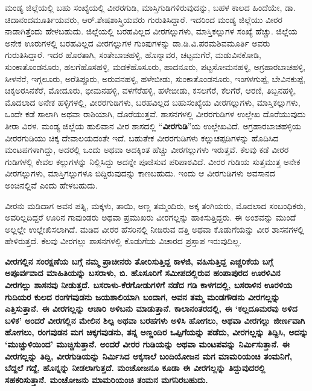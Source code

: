 ಮಂಡ್ಯ ಜಿಲ್ಲೆಯಲ್ಲಿ ಬಹು ಸಂಖ್ಯೆಯಲ್ಲಿ ವೀರರಗುಡಿ, ಮಾಸ್ತಿಗುಡಿಗಳಿರುವುದನ್ನು, ಬಹಳ ಕಾಲದ ಹಿಂದೆಯೇ, ಡಾ. ಚಿದಾನಂದಮೂರ್ತಿಯವರು, ಆರ್​.ಶೇಷಶಾಸ್ತ್ರಿಯವರು ಗುರುತಿಸಿದ್ದಾರೆ. ಇದರಿಂದ ಮಂಡ್ಯ ಜಿಲ್ಲೆಯು ವೀರರ ನಾಡಾಗಿತ್ತೆಂದು ಹೇಳಬಹುದು. ಜಿಲ್ಲೆಯಲ್ಲಿ ಬರಹವಿಲ್ಲದ ವೀರಗಲ್ಲುಗಳು, ಮಾಸ್ತಿಕಲ್ಲುಗಳ ಸಂಖ್ಯೆ ಹೆಚ್ಚು. ಜಿಲ್ಲೆಯ ಅನೇಕ ಊರುಗಳಲ್ಲಿ ಬರಹವಿಲ್ಲದ ವೀರಗಲ್ಲುಗಳ ಗುಂಪುಗಳನ್ನು ಡಾ.ಡಿ.ವಿ.ಪರಮಶಿವಮೂರ್ತಿ ಅವರು ಗುರುತಿಸಿದ್ದಾರೆ. ಇದರ ಹೊರತಾಗಿ, ಸಂತೇಬಾಚಹಳ್ಳಿ, ಹೊನ್ನಾವರ, ಚಟ್ಟಮಗೆರೆ, ಮಡುವಿನಕೋಡಿ, ಸುಂಕಾತೊಂಡನೂರು, ಹಲಗೆಹೊಸಹಳ್ಳಿ, ಮಡಕೆಹೊಸೂರು, ಹಾದನೂರು, ಪಟ್ಟಸೋಮನಹಳ್ಳಿ, ಅಗ್ರಹಾರಬಾಚಹಳ್ಳಿ, ಸೀಳನೆರೆ, ಇಗ್ಗಲೂರು, ಅರೆತಿಪ್ಪೂರು, ಅರುವನಹಳ್ಳಿ, ಹಳೇಬೀಡು, ಸುಂಕಾತೊಂಡನೂರು, ಇಂಗಳಗುಪ್ಪೆ, ಬೇವಿನಕುಪ್ಪೆ, ಚಿಕ್ಕಅರಸಿನಕೆರೆ, ಮೋದೂರು, ಭೀಮನಹಳ್ಳಿ, ವಳಗೆರೆಹಳ್ಳಿ, ಹಳೇಬೀಡು, ಕಸಲಗೆರೆ, ಕೆಲಗೆರೆ, ಆರಣಿ, ತಿಬ್ಬನಹಳ್ಳಿ, ಮೊದಲಾದ ಅನೇಕ ಹಳ್ಳಿಗಳಲ್ಲಿ, ವೀರರಗುಡಿಗಳು, ಬರಹವಿಲ್ಲದ ಬಹುಸಂಖ್ಯೆಯ ವೀರಗಲ್ಲುಗಳು, ಮಾಸ್ತಿಕಲ್ಲು\break ಗಳು, ಒಂದೇ ಕಡೆ ಸಾಲಾಗಿ ಅಥವಾ ರಾಶಿಯಾಗಿ, ದೊರೆಯುತ್ತವೆ. ಶಾಸನಗಳಲ್ಲಿ ವೀರರಗುಡಿಗಳ ಉಲ್ಲೇಖ ದೊರೆಯುವುದು ತೀರಾ ವಿರಳ. ಮಂಡ್ಯ ಜಿಲ್ಲೆಯ ಹುಲಿವಾನ ವೀರ ಶಾಸದಲ್ಲಿ “\textbf{ವೀರಗುಡಿ}”ಯ ಉಲ್ಲೇಖವಿದೆ. ಅಗ್ರಹಾರಬಾಚಹಳ್ಳಿಯ ವೀರರಗುಡಿಯು ಚಿಕ್ಕ ದೇವಾಲಯದಂತೇ ಇದೆ. ಬಹುತೇಕ ವೀರರಗುಡಿಗಳು ಕಲ್ಲುಚಪ್ಪಡಿಗಳನ್ನು ಹೊದಿಸಿದ ಮಂಟಪಗಳಾ\-ಗಿದ್ದು, ಅದರಲ್ಲಿ ಒಂದು ಅಥವಾ ಅದಕ್ಕಿಂತ ಹೆಚ್ಚು ವೀರಗಲ್ಲುಗಳು ಇರುತ್ತವೆ. ಕೆಲವು ಕಡೆ ವೀರರ ಗುಡಿಗಳಲ್ಲಿ ಕೇವಲ ಕಲ್ಲುಗಳನ್ನು ನಿಲ್ಲಿಸಿದ್ದು ಅದನ್ನೇ ಪೂಜಿಸುವ ಪರಿಪಾಠವಿದೆ. ವೀರರ ಗುಡಿಯ ಸುತ್ತಮುತ್ತ ಅನೇಕ ವೀರಗಲ್ಲುಗಳು, ಮಾಸ್ತಿಗಲ್ಲುಗಳೂ ಬಿದ್ದಿರುವುದನ್ನು ಕಾಣಬಹುದು. ಇಂದು ಆ ವೀರಗುಡಿಗಳು ಅವಸಾನದ ಅಂಚಿನಲ್ಲಿವೆ ಎಂದು ಹೇಳಬಹುದು.

ವೀರನು ಮಡಿದಾಗ ಅವನ ಪತ್ನಿ, ಮಕ್ಕಳು, ತಾಯಿ, ಅಣ್ಣ ತಮ್ಮಂದಿರು, ಅಕ್ಕ ತಂಗಿಯರು, ಮೊದಲಾದ ಸಂಬಂಧಿಕರು, ಅವರಿಲ್ಲದಿದ್ದರೆ ಊರಿನ ಗಾವುಂಡರು ಅಥವಾ ಪ್ರಮುಖರು ವೀರಗಲ್ಲನ್ನು ಹಾಕಿಸುತ್ತಿದ್ದರು. ಈ ಅಂಶವನ್ನು ಮುಂದೆ ಅಲ್ಲಲ್ಲೇ ಉಲ್ಲೇಖಿಸಲಾಗಿದೆ. ಮಡಿದ ವೀರರ ಹೆಸರಿನಲ್ಲಿ ನೀಡಿರುವ ದತ್ತಿ ಅಥವಾ ಕೊಡುಗೆಯನ್ನು ವೀರ ಶಾಸನಗಳಲ್ಲಿ ಹೇಳಿರುತ್ತದೆ. ಕೆಲವು ವೀರಗಲ್ಲು ಶಾಸನಗಳಲ್ಲಿ ಕೊಡುಗೆಯ ವಿಚಾರದ ಪ್ರಸ್ತಾಪ ಇರುವುದಿಲ್ಲ.

\textbf{ವೀರಗಲ್ಲಿನ ಸಂರಕ್ಷಣೆಯ ಬಗ್ಗೆ ನಮ್ಮ ಪ್ರಾಚೀನರು ತೋರಿಸುತ್ತಿದ್ದ ಕಾಳಜಿ, ವಹಿಸುತ್ತಿದ್ದ ಎಚ್ಚರಿಕೆಯ ಬಗ್ಗೆ ಅಪೂರ್ವವಾದ ಮಾಹಿತಿಯನ್ನು ಬಸರಾಳು, ಬಿ. ಹೊಸೂರಿಗೆ ಸಮೀಪದಲ್ಲಿರುವ ಹಂಪಾಪುರದ ಊರಳಿವಿನ ವೀರಗಲ್ಲು ಶಾಸನವು ನೀಡುತ್ತದೆ. ಬಸರಾಳು-ಕೆರಗೋಡುಗಳಿಗೆ ನಡೆದ ಗಡಿ ಕಾಳಗದಲ್ಲಿ, ಬಸರಾಳಿನ ಊರಳಿಯ ಗುದಿಯರ ಕುಲದ ರಂಗಗವುಡನು ಜಯಶಾಲಿಯಾಗಿ ಬಂದಾಗ, ಅವನ ತಮ್ಮ ಮಂಡಗೌಡನು ವೀರಗಲ್ಲನ್ನು ಎತ್ತಿಸುತ್ತಾನೆ. ಈ ವೀರಗಲ್ಲನ್ನು ಆಚಾರಿ ಅಳಿಬನು ಮಾಡುತ್ತಾನೆ. ಕಾಲಾನಂತರದಲ್ಲಿ, ಈ ‘ಕಲ್ಲದೂಮರವು ಅಳಿದ ಬಳಿಕ’ ಅಂದರೆ ವೀರಗಲ್ಲಿನ ಮೇಲಿನ ಶಿಲ್ಪ ಅಥವಾ ಬರಹಗಳು ಅಳಿಸಿ ಹೋಗಲು, ಅಥವಾ ವೀರಗಲ್ಲು ಜೀರ್ಣವಾಗಿ ಹೋಗಲು, ರಂಗವುಡನ ಮಗ ಚಿಕ್ಕಗವುಡನು, ತನ್ನ ಅಣ್ಣಂದಿರ ಒಪ್ಪಿಗೆಯನ್ನು ಪಡೆದು, ವೀರಗಲ್ಲನ್ನು ತಿದ್ದಿಸಿ, ಅದನ್ನು ‘ಮುಚ್ಚುಳಿಯಿಂದ’ ಮುಚ್ಚಿಸುತ್ತಾನೆ. ಅಂದರೆ ವೀರರ ಗುಡಿಯನ್ನು ಅಥವಾ ಮಂಟಪವನ್ನು ನಿರ್ಮಿಸುತ್ತಾನೆ. ಈ ವೀರಗಲ್ಲನ್ನು ತಿದ್ದಿ, ವೀರಗುಡಿಯನ್ನು ನಿರ್ಮಿಸಿದ ಅಕ್ಕಸಾಲೆ ಬಂದಿಯೋಜನ ಮಗ ಮಾಮರಿಯಂಚಿ ತಂಮನಿಗೆ,  ಬೆದ್ದಲೆ ಗದ್ದೆ,  ಹೊನ್ನನ್ನು ನೀಡಲಾಗುತ್ತದೆ. ಮಂಚೋಜನೂ ಕೂಡಾ ಈ ವೀರಗಲ್ಲನ್ನು ತಿದ್ದುವುದರಲ್ಲಿ ಸಹಕರಿಸುತ್ತಾನೆ. ಮಂಚೋಜನು ಮಾಮರಿಯಂಚಿ ತಂಮನ ಮಗನಿರಬಹುದು.}

